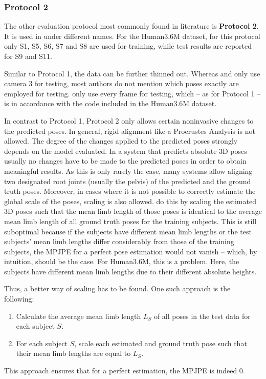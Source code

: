 \subsubsection{Protocol 2}\label{sec:protocol2}

The other evaluation protocol most commonly found in literature is \textbf{Protocol 2}.
It is used in \cite{sun17, moreno-noguer16, bogo16, martinez17, zhou18, zhou16, tekin16, pavlakos17, sun17} under different names.
For the Human3.6M dataset, for this protocol only S1, S5, S6, S7 and S8 are used for training, while test results are reported for S9 and S11.

Similar to Protocol 1, the data can be further thinned out.
Whereas \citet{moreno-noguer16} and \citet{bogo16} only use camera 3 for testing, most authors do not mention which poses exactly are employed for testing.
\citet{sun17} only use every  frame for testing, which -- as for Protocol 1 -- is in accordance with the code included in the Human3.6M dataset.

In contrast to Protocol 1, Protocol 2 only allows certain noninvasive changes to the predicted poses.
In general, rigid alignment like a Procrustes Analysis is not allowed.
The degree of the changes applied to the predicted poses strongly depends on the model evaluated.
In a system that predicts absolute 3D poses usually no changes have to be made to the predicted poses in order to obtain meaningful results.
As this is only rarely the case, many systems \cite{martinez17, zhou18, zhou16, tekin16, pavlakos17} allow aligning two designated root joints (usually the pelvis) of the predicted and the ground truth poses.
Moreover, in cases where it is not possible to correctly estimate the global scale of the poses, scaling is also allowed.
\citet{zhou18} do this by scaling the estimated 3D poses such that the mean limb length of those poses is identical to the average mean limb length of all ground truth poses for the training subjects.
This is still suboptimal because if the subjects have different mean limb lengths or the test subjects' mean limb lengths differ considerably from those of the training subjects, the MPJPE for a perfect pose estimation would not vanish -- which, by intuition, should be the case.
For Human3.6M, this is a problem.
Here, the subjects have different mean limb lengths due to their different absolute heights.

Thus, a better way of scaling has to be found.
One such approach is the following:
\begin{enumerate}[label={\arabic*.}]
	\item Calculate the average mean limb length $L_S$ of all poses in the test data for each subject $S$.
	\item For each subject $S$, scale each estimated and ground truth pose such that their mean limb lengths are equal to $L_S$.
\end{enumerate}
This approach ensures that for a perfect estimation, the MPJPE is indeed 0.


